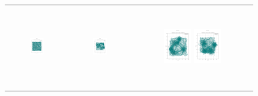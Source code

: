 \begin{figure}[p]
\begin{tabular}{ccc}
         \includegraphics[height=36mm,width=0.24\textwidth]{Images/simulation_no_obs/dubins_path/31.png}
        & \includegraphics[height=36mm,width=0.24\textwidth]{Images/simulation_no_obs/dubins_path/32.png}
        & \includegraphics[height=36mm,width=0.24\textwidth]{Images/simulation_no_obs/dubins_path/33.png}
         \includegraphics[height=36mm,width=0.24\textwidth]{Images/simulation_no_obs/dubins_path/34.png}\\[-4pt]



\end{tabular}
\end{figure}

